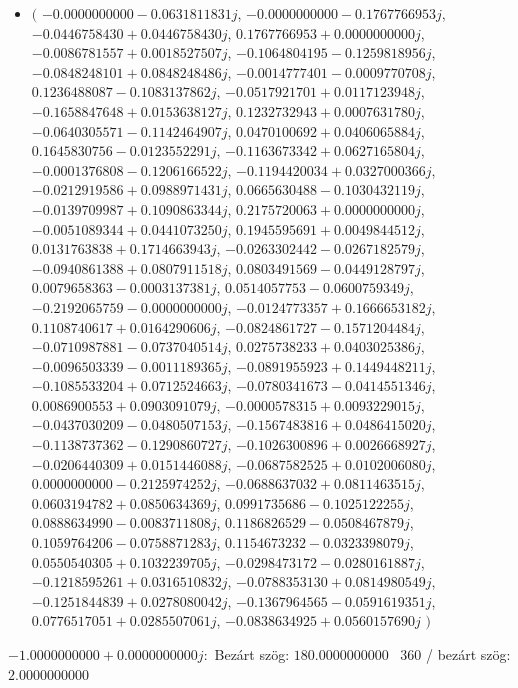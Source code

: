 \documentclass[14pt,a4paper]{article}
\begin{document}
\begin{itemize}
\item
$\big($
$-0.0000000000-0.0631811831j$, $-0.0000000000-0.1767766953j$, $-0.0446758430+0.0446758430j$, $0.1767766953+0.0000000000j$, $-0.0086781557+0.0018527507j$, $-0.1064804195-0.1259818956j$, $-0.0848248101+0.0848248486j$, $-0.0014777401-0.0009770708j$, $0.1236488087-0.1083137862j$, $-0.0517921701+0.0117123948j$, $-0.1658847648+0.0153638127j$, $0.1232732943+0.0007631780j$, $-0.0640305571-0.1142464907j$, $0.0470100692+0.0406065884j$, $0.1645830756-0.0123552291j$, $-0.1163673342+0.0627165804j$, $-0.0001376808-0.1206166522j$, $-0.1194420034+0.0327000366j$, $-0.0212919586+0.0988971431j$, $0.0665630488-0.1030432119j$, $-0.0139709987+0.1090863344j$, $0.2175720063+0.0000000000j$, $-0.0051089344+0.0441073250j$, $0.1945595691+0.0049844512j$, $0.0131763838+0.1714663943j$, $-0.0263302442-0.0267182579j$, $-0.0940861388+0.0807911518j$, $0.0803491569-0.0449128797j$, $0.0079658363-0.0003137381j$, $0.0514057753-0.0600759349j$, $-0.2192065759-0.0000000000j$, $-0.0124773357+0.1666653182j$, $0.1108740617+0.0164290606j$, $-0.0824861727-0.1571204484j$, $-0.0710987881-0.0737040514j$, $0.0275738233+0.0403025386j$, $-0.0096503339-0.0011189365j$, $-0.0891955923+0.1449448211j$, $-0.1085533204+0.0712524663j$, $-0.0780341673-0.0414551346j$, $0.0086900553+0.0903091079j$, $-0.0000578315+0.0093229015j$, $-0.0437030209-0.0480507153j$, $-0.1567483816+0.0486415020j$, $-0.1138737362-0.1290860727j$, $-0.1026300896+0.0026668927j$, $-0.0206440309+0.0151446088j$, $-0.0687582525+0.0102006080j$, $0.0000000000-0.2125974252j$, $-0.0688637032+0.0811463515j$, $0.0603194782+0.0850634369j$, $0.0991735686-0.1025122255j$, $0.0888634990-0.0083711808j$, $0.1186826529-0.0508467879j$, $0.1059764206-0.0758871283j$, $0.1154673232-0.0323398079j$, $0.0550540305+0.1032239705j$, $-0.0298473172-0.0280161887j$, $-0.1218595261+0.0316510832j$, $-0.0788353130+0.0814980549j$, $-0.1251844839+0.0278080042j$, $-0.1367964565-0.0591619351j$, $0.0776517051+0.0285507061j$, $-0.0838634925+0.0560157690j$
$\big)$
\end{itemize}
$-1.0000000000+0.0000000000j$:\
Bezárt szög: $180.0000000000$ \
360 / bezárt szög: $2.0000000000$\
\end{document}
